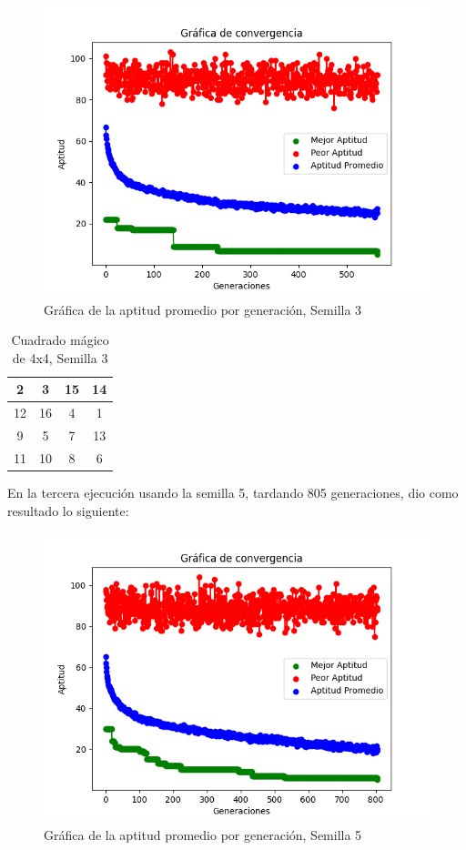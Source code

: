 \documentclass{report}
\begin{document}
    \begin{figure}[H]
        \centering
        \includegraphics[scale=0.5]{Grafica2_2.png}
        \caption{Gráfica de la aptitud promedio por generación, Semilla 3}
    \end{figure}
    \begin{table}[H]
        \centering
        \begin{tabular}{|c|c|c|c|}
            \hline
            2 & 3 & 15 & 14\\
            \hline
            12 & 16 & 4 & 1\\
            \hline
            9 & 5 & 7 & 13\\
            \hline
            11 & 10 & 8 & 6\\
            \hline
        \end{tabular}
        \caption{Cuadrado mágico de 4x4, Semilla 3}
    \end{table}
    En la tercera ejecución usando la semilla 5, tardando 805 generaciones, dio como resultado lo siguiente:
    \begin{figure}[H]
        \centering
        \includegraphics[scale=0.5]{Grafica3_2.png}
        \caption{Gráfica de la aptitud promedio por generación, Semilla 5}
    \end{figure}
\end{document}
